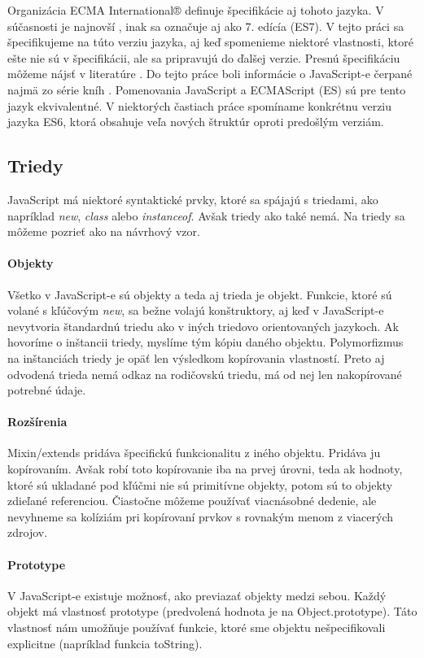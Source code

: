Organizácia {ECMA International®} definuje špecifikácie aj tohoto jazyka. V súčasnosti je najnovší \JS{}, inak sa označuje aj ako 7. edícía (ES7). V tejto práci sa špecifikujeme na túto verziu jazyka, aj keď spomenieme niektoré vlastnosti, ktoré ešte nie sú v špecifikácii, ale sa pripravujú do ďalšej verzie. Presnú špecifikáciu môžeme nájsť v literatúre \cite[\JS{}]{ECMAScript}.
Do tejto práce boli informácie o JavaScript-e čerpané najmä zo série kníh \cite[You Don't Know JS]{youDontKnowJS1, youDontKnowJS2, youDontKnowJS3, youDontKnowJS4, youDontKnowJS5, youDontKnowJS6}.
Pomenovania JavaScript a ECMAScript (ES) sú pre tento jazyk ekvivalentné.
V niektorých častiach práce spomíname konkrétnu verziu jazyka ES6, ktorá obsahuje veľa nových štruktúr oproti predošlým verziám.

\subsection{Triedy}
JavaScript má niektoré syntaktické prvky, ktoré sa spájajú s triedami, ako napríklad \emph{new}, \emph{class} alebo \emph{instanceof}. Avšak triedy ako také nemá. Na triedy sa môžeme pozrieť ako na návrhový vzor. 

\paragraph{Objekty}
Všetko v JavaScript-e sú objekty a teda aj trieda je objekt. Funkcie, ktoré sú volané s kľúčovým \emph{new}, sa bežne volajú konštruktory, aj keď v JavaScript-e nevytvoria štandardnú triedu ako v iných triedovo orientovaných jazykoch. 
Ak hovoríme o inštancii triedy, myslíme tým kópiu daného objektu. Polymorfizmus na inštanciách triedy je opäť len výsledkom kopírovania vlastností. Preto aj odvodená trieda nemá odkaz na rodičovskú triedu, má od nej len nakopírované potrebné údaje.

\paragraph{Rozšírenia}
Mixin/extends pridáva špecifickú funkcionalitu z iného objektu. Pridáva ju kopírovaním. Avšak robí toto kopírovanie iba na prvej úrovni, teda ak hodnoty, ktoré sú ukladané pod kľúčmi nie sú primitívne objekty, potom sú to objekty zdieľané referenciou. Čiastočne môžeme používať viacnásobné dedenie, ale nevyhneme sa kolíziám pri kopírovaní prvkov s rovnakým menom z viacerých zdrojov.

\paragraph{Prototype}
V JavaScript-e existuje možnosť, ako previazať objekty medzi sebou. Každý objekt má vlastnosť prototype (predvolená hodnota je na Object.prototype). Táto vlastnosť nám umožňuje používať funkcie, ktoré sme objektu nešpecifikovali explicitne (napríklad funkcia toString).


